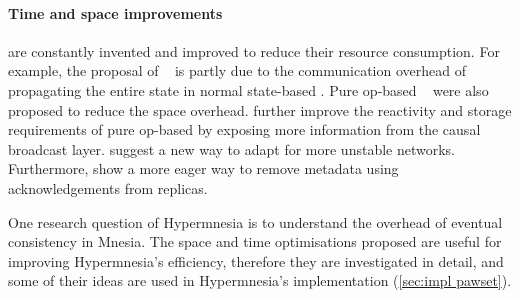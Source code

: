 \paragraph{Time and space improvements} \label{subsec:related crdt performance}

 are constantly invented and improved to reduce their resource 
consumption.
For example, the proposal of ~\cite{almeida2018DeltaCRDT} is partly
due to the 
communication overhead of propagating the entire state in normal state-based
. Pure op-based ~\cite{baquero2014PureOp} were also 
proposed to reduce the space overhead. \citet{bauwens2021Reactivity}
further improve the reactivity and storage requirements of pure op-based
 by exposing more information from the causal broadcast 
layer. \citet{vanderlinde2016delta-CRDTs} suggest a new way to 
adapt  for more unstable networks.
Furthermore, \citet{bauwens2019crdtmemory} show a more eager way to remove metadata
using acknowledgements from replicas.

One research question of Hypermnesia is to understand the overhead of
eventual consistency in Mnesia. The space and time optimisations proposed are 
useful for improving Hypermnesia's efficiency,
therefore they are investigated in detail, and some of their ideas are
used in Hypermnesia's implementation (\cref{sec:impl pawset}).

